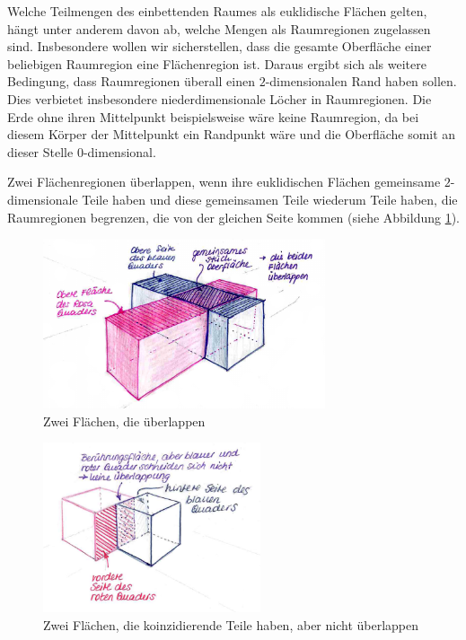         Welche Teilmengen des einbettenden Raumes als euklidische Flächen gelten, hängt unter anderem davon ab, welche Mengen als Raumregionen zugelassen sind. Insbesondere wollen wir sicherstellen, dass die gesamte Oberfläche einer beliebigen Raumregion eine Flächenregion ist. Daraus ergibt sich als weitere Bedingung, dass Raumregionen überall einen $2$-dimensionalen Rand haben sollen. Dies verbietet insbesondere niederdimensionale Löcher in Raumregionen. Die Erde ohne ihren Mittelpunkt beispielsweise wäre keine Raumregion, da bei diesem Körper der Mittelpunkt ein Randpunkt wäre und die Oberfläche somit an dieser Stelle $0$-dimensional.
    
        Zwei Flächenregionen überlappen, wenn ihre euklidischen Flächen gemeinsame $2$-dimensionale Teile haben und diese gemeinsamen Teile wiederum Teile haben, die Raumregionen begrenzen, die von der gleichen Seite kommen (siehe Abbildung \ref{fig:overlap}).
    
%         
        \begin{figure}[ht]
            \centering
            \includegraphics[height=5cm]{abb/overlap.png}
            \caption{Zwei Flächen, die überlappen}
            \label{fig:overlap}
        \end{figure}
        
        \begin{figure}[ht]
            \centering
            \includegraphics[height=5cm]{abb/no-overlap.png}
            \caption{Zwei Flächen, die koinzidierende Teile haben, aber nicht überlappen}
            \label{fig:no-overlap}
        \end{figure}

